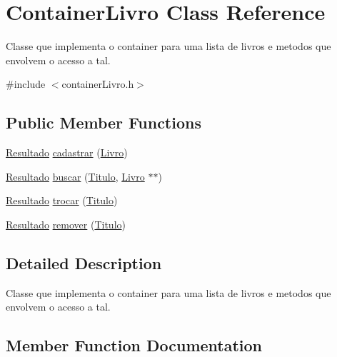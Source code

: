 \hypertarget{classContainerLivro}{}\section{Container\+Livro Class Reference}
\label{classContainerLivro}


Classe que implementa o container para uma lista de livros e metodos que envolvem o acesso a tal.  




{\ttfamily \#include $<$container\+Livro.\+h$>$}

\subsection*{Public Member Functions}
\begin{DoxyCompactItemize}
\item 
\hyperlink{classResultado}{Resultado} \hyperlink{classContainerLivro_a85b97c6680de42dd786b4fbe9f9969a5}{cadastrar} (\hyperlink{classLivro}{Livro})
\item 
\hyperlink{classResultado}{Resultado} \hyperlink{classContainerLivro_a1de05fa370f2cfaceabfe5ed59b86d03}{buscar} (\hyperlink{classTitulo}{Titulo}, \hyperlink{classLivro}{Livro} $\ast$$\ast$)
\item 
\hyperlink{classResultado}{Resultado} \hyperlink{classContainerLivro_a97f49d9f9ef66437986b5d947db126d6}{trocar} (\hyperlink{classTitulo}{Titulo})
\item 
\hyperlink{classResultado}{Resultado} \hyperlink{classContainerLivro_a5f38b5d1a6b133f28860d8039fa412cd}{remover} (\hyperlink{classTitulo}{Titulo})
\end{DoxyCompactItemize}


\subsection{Detailed Description}
Classe que implementa o container para uma lista de livros e metodos que envolvem o acesso a tal. 

\subsection{Member Function Documentation}
\mbox{\label{classContainerLivro_a1de05fa370f2cfaceabfe5ed59b86d03}} 
